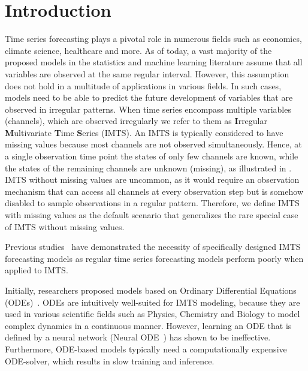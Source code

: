 \section{Introduction}

Time series forecasting plays a pivotal role in numerous fields such as economics, climate science, healthcare and more. 
As of today, a vast majority of the proposed models in the statistics and machine learning literature assume that all variables are observed at the same regular interval. 
However, this assumption does not hold in a multitude of applications in various fields. 
In such cases, models need to be able to predict the future development of variables that are observed in irregular patterns.
When time series encompass multiple variables (channels), which are observed irregularly we refer to them as \textbf{I}rregular \textbf{M}ultivariate \textbf{T}ime \textbf{S}eries (IMTS). 
An IMTS is typically considered to have missing values because most channels are not observed simultaneously.
Hence, at a single observation time point the states of only few channels are known, while the states of the remaining channels are unknown (missing), as illustrated in .
IMTS without missing values are uncommon, as it would require an observation mechanism that can access all channels at every observation step but is somehow disabled to sample observations in a regular pattern. 
Therefore, we define IMTS with missing values as the default scenario that generalizes the rare special case of IMTS without missing values.



Previous studies~\cite{Che2018.Recurrent,Yalavarthi2023.Forecasting,Zhang.Irregular} have demonstrated the necessity of specifically designed IMTS forecasting models as regular time series forecasting models perform poorly when applied to IMTS.\@

Initially, researchers proposed models based on Ordinary Differential Equations (ODEs)~\cite{Chen2018.Neural,DeBrouwer2019.GRUODEBayes,Bilos2021.Neural,Schirmer2022.Modeling}. 
ODEs are intuitively well-suited for IMTS modeling, because they are used in various scientific fields
such as Physics, Chemistry and Biology to model complex dynamics in a continuous manner. 
However, learning an ODE that is defined by a neural network (Neural ODE~\cite{Chen2018.Neural}) has shown to be ineffective.
Furthermore, ODE-based models typically need a computationally expensive ODE-solver, which results in slow training and inference. 

